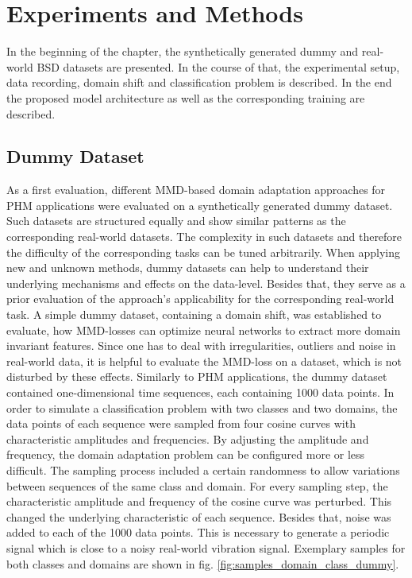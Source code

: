 \chapter{Experiments and Methods}\label{chapter:experiments}
In the beginning of the chapter, the synthetically generated dummy and real-world BSD datasets are presented. In the course of that, the experimental setup, data recording, domain shift and classification problem is described. In the end the proposed model architecture as well as the corresponding training are described. 
\section{Dummy Dataset}
As a first evaluation, different MMD-based domain adaptation approaches for PHM applications were evaluated on a synthetically generated dummy dataset. Such datasets are structured equally and show similar patterns as the corresponding real-world datasets. The complexity in such datasets and therefore the difficulty of the corresponding tasks can be tuned arbitrarily. When applying new and unknown methods, dummy datasets can help to understand their underlying mechanisms and effects on the data-level. Besides that, they serve as a prior evaluation of the approach's applicability for the corresponding real-world task. A simple dummy dataset, containing a domain shift, was established to evaluate, how MMD-losses can optimize neural networks to extract more domain invariant features. Since one has to deal with irregularities, outliers and noise in real-world data, it is helpful to evaluate the MMD-loss on a dataset, which is not disturbed by these effects. Similarly to PHM applications, the dummy dataset contained one-dimensional time sequences, each containing 1000 data points. In order to simulate a classification problem with two classes and two domains, the data points of each sequence were sampled from four cosine curves with characteristic amplitudes and frequencies. By adjusting the amplitude and frequency, the domain adaptation problem can be configured more or less difficult. The sampling process included a certain randomness to allow variations between sequences of the same class and domain. For every sampling step, the characteristic amplitude and frequency of the cosine curve was perturbed. This changed the underlying characteristic of each sequence. Besides that, noise was added to each of the 1000 data points. This is necessary to generate a periodic signal which is close to a noisy real-world vibration signal. Exemplary samples for both classes and domains are shown in fig. \ref{fig:samples_domain_class_dummy}.

